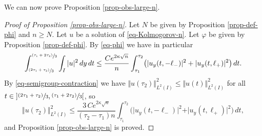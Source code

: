 \documentclass[JEP,XML,SOM,Unicode]{cedram}
\newcommand{\psfrac}[2]{\sfrac{(#1)}{#2}}
\theoremstyle{plain}
\theoremstyle{definition}
\newcommand{\abs}[1]{\vert #1\vert}
\newcommand{\nr}[1]{\Vert #1\Vert}
\newcommand{\1}{\mathds 1}
\let\k\kappa
\let\f\varphi
\begin{document}
We can now prove Proposition \ref{prop-obs-large-n}.

\begin{proof}[Proof of Proposition \ref{prop-obs-large-n}]
Let $N$ be given by Proposition \ref{prop-def-phi} and $n \geq N$. Let $u$ be a solution of \eqref{eq-Kolmogorov-n}. Let $\f$ be given by Proposition \ref{prop-def-phi}. By \eqref{eq-phi} we have in particular
\[
\int_{\psfrac{2 \tau_1 + \tau_2}{3}}^{\psfrac{\tau_1 + 2\tau_2}{3}} \int_{I} \abs{u}^2 \, dy \, dt \leq \frac {C e^{2 \k \sqrt n}} n \int_{\tau_1}^{\tau_2} \bigl(\abs{u_y (t,-\ell_-)}^2 + \abs{u_y(t,\ell_+)}^2 \bigr) \, dt.
\]
By \eqref{eq-semigroup-contraction} we have $\nr{u(\tau_2)}_{L^2(I)}^2 \leq \nr{u(t)}_{L^2(I)}^2$ for all $t \in{}] \psfrac{2\tau_1 + \tau_2}{3}, \psfrac{\tau_1 + 2\tau_2}{3}[$, so
\[
\nr{u(\tau_2)}_{L^2(I)}^2 \leq \frac{3\,C e^{2 \k \sqrt n}}{(\tau_2-\tau_1)n} \int_{\tau_1}^{\tau_2} \bigl(\abs{u_y (t,-\ell_-)}^2 + \abs{u_y(t,\ell_+)}^2 \bigr) \, dt,
\]
and Proposition \ref{prop-obs-large-n} is proved.
\end{proof}

\backmatter


\end{document}
